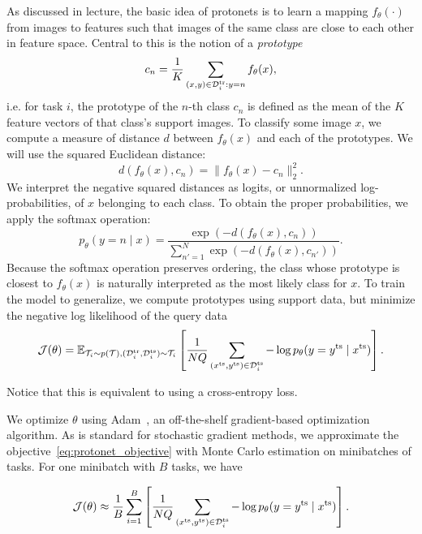 As discussed in lecture, the basic idea of protonets is to learn a mapping $f_\theta(\cdot)$ from images to features such that images of the same class are close to each other in feature space. Central to this is the notion of a \emph{prototype}
\begin{equation}
    c_n = \frac{1}{K} \sum_{(x,y) \in \mathcal{D}^\mathrm{tr}_i : y = n} f_\theta(x),
\end{equation}
i.e. for task $i$, the prototype of the $n$-th class $c_n$ is defined as the mean of the $K$ feature vectors of that class's support images.
To classify some image $x$, we compute a measure of distance $d$ between $f_\theta(x)$ and each of the prototypes. We will use the squared Euclidean distance:
\begin{equation}
    d(f_\theta(x), c_n) = \| f_\theta(x) - c_n \|_2^2.
\end{equation}
We interpret the negative squared distances as logits, or unnormalized log-probabilities, of $x$ belonging to each class. To obtain the proper probabilities, we apply the softmax operation:
\begin{equation}
    p_\theta(y=n \mid x) = \frac{\exp(-d(f_\theta(x), c_n))}{\sum_{n'=1}^N \exp(-d(f_\theta(x), c_{n'}))}.
\end{equation}
Because the softmax operation preserves ordering, the class whose prototype is closest to $f_\theta(x)$ is naturally interpreted as the most likely class for $x$. To train the model to generalize, we compute prototypes using support data, but minimize the negative log likelihood of the query data
\begin{equation}
    \mathcal{J}(\theta) = \mathbb{E}_{\mathcal{T}_i \sim p(\mathcal{T}), (\mathcal{D}^\mathrm{tr}_i, \mathcal{D}^\mathrm{ts}_i) \sim \mathcal{T}_i} \left[ \frac{1}{NQ} \sum_{({x}^\mathrm{ts},{y}^\mathrm{ts}) \in \mathcal{D}^\mathrm{ts}_i} - \log p_\theta(y = {y}^\mathrm{ts} \mid {x}^\mathrm{ts}) \right].
    \label{eq:protonet_objective}
\end{equation}

Notice that this is equivalent to using a cross-entropy loss.

We optimize $\theta$ using Adam~\cite{kingma2014adam}, an off-the-shelf gradient-based optimization algorithm.
As is standard for stochastic gradient methods, we approximate the objective~\eqref{eq:protonet_objective} with Monte Carlo estimation on minibatches of tasks. For one minibatch with $B$ tasks, we have

\begin{equation}
    \mathcal{J}(\theta) \approx \frac{1}{B} \sum_{i=1}^B 
     \left[ \frac{1}{NQ} \sum_{({x}^\mathrm{ts},{y}^\mathrm{ts}) \in \mathcal{D}^\mathrm{ts}_i} - \log p_\theta(y = {y}^\mathrm{ts} \mid {x}^\mathrm{ts}) \right].
    \label{eq:protonet_objective_minibatch}
\end{equation}

\begin{enumerate}[label={1.\alph*}]
	
    
    
    
\end{enumerate}